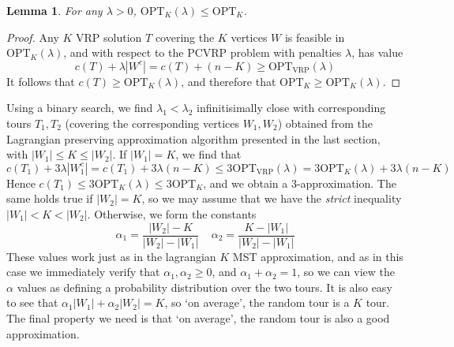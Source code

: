 \documentclass{article}
\theoremstyle{plain}
\newtheorem{lemma}{Lemma}
\begin{document}
\begin{lemma}
    For any $\lambda > 0$, $\text{OPT}_K(\lambda) \leq \text{OPT}_K$.
\end{lemma}
\begin{proof}
    Any $K$ VRP solution $T$ covering the $K$ vertices $W$ is feasible in $\text{OPT}_K(\lambda)$, and with respect to the $\text{PCVRP}$ problem with penalties $\lambda$, has value
    \[ c(T) + \lambda |W^c| = c(T) + (n - K) \geq \text{OPT}_{\text{VRP}}(\lambda) \]
    It follows that $c(T) \geq \text{OPT}_K(\lambda)$, and therefore that $\text{OPT}_K \geq \text{OPT}_K(\lambda)$.
\end{proof}

Using a binary search, we find $\lambda_1 < \lambda_2$ infinitisimally close with corresponding tours $T_1,T_2$ (covering the corresponding vertices $W_1,W_2$) obtained from the Lagrangian preserving approximation algorithm presented in the last section, with $|W_1| \leq K \leq |W_2|$. If $|W_1| = K$, we find that
%
\[ c(T_1) + 3 \lambda |W_1^c| = c(T_1) + 3 \lambda (n - K) \leq 3 \text{OPT}_{\text{VRP}}(\lambda) = 3 \text{OPT}_K(\lambda) + 3 \lambda(n - K) \]
%
Hence $c(T_1) \leq 3 \text{OPT}_K(\lambda) \leq 3 \text{OPT}_K$, and we obtain a $3$-approximation. The same holds true if $|W_2| = K$, so we may assume that we have the {\it strict} inequality $|W_1| < K < |W_2|$. Otherwise, we form the constants
%
\[ \alpha_1 = \frac{|W_2| - K}{|W_2| - |W_1|}\ \ \ \ \ \alpha_2 = \frac{K - |W_1|}{|W_2| - |W_1|} \]
%
These values work just as in the lagrangian $K$ MST approximation, and as in this case we immediately verify that $\alpha_1, \alpha_2 \geq 0$, and $\alpha_1 + \alpha_2 = 1$, so we can view the $\alpha$ values as defining a probability distribution over the two tours. It is also easy to see that $\alpha_1 |W_1| + \alpha_2 |W_2| = K$, so `on average', the random tour is a $K$ tour. The final property we need is that `on average', the random tour is also a good approximation.
\end{document}

